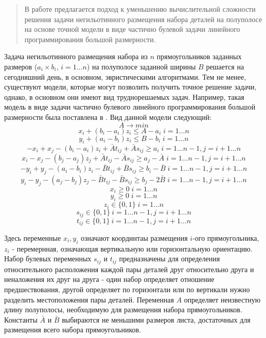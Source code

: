 
\maketitle

\begin{abstract}
В работе предлагается подход к уменьшению вычислительной сложности решения задачи негильотинного размещения набора деталей на полуполосе на основе точной модели в виде частично булевой задачи линейного программирования большой размерности.

\end{abstract}

Задача негильотинного размещения набора из $n$ прямоугольников заданных размеров ($a_i \times b_i$, $i=1\ldots n$) на полуполосе заданной ширины $B$ решается на сегодняшний день, в основном, эвристическими алгоритмами. Тем не менее, существуют модели, которые могут позволить получить точное решение задачи, однако, в основном они имеют вид труднорешаемых задач. Например, такая модель в виде задачи частично булевого линейного программирования большой размерности была поставлена в \cite{Andr_Faz_Much}. Вид данной модели следующий:
$$A\to min$$
$$x_i +(b_i-a_i)z_i\le A-a_i \;  i=1\ldots n$$
$$y_i +(a_i-b_i)z_i\le B-b_i \; i=1\ldots n$$
$$-x_i+x_j -(b_i-a_i)z_i +\bar{A}t_{ij}+\bar{A}s_{ij}\ge a_i \; i=1\ldots n-1, j=i+1\ldots n $$
$$x_i-x_j -(b_j-a_j)z_j +\bar{A}t_{ij}-\bar{A}s_{ij}\ge a_j-\bar{A} \; i=1\ldots n-1, j=i+1\ldots n $$
$$-y_i+y_j -(a_i-b_i)z_i -\bar{B}t_{ij}+\bar{B}s_{ij}\ge b_i-\bar{B} \; i=1\ldots n-1, j=i+1\ldots n $$
$$y_i-y_j -(a_j-b_j)z_j -\bar{B}t_{ij}-\bar{B}s_{ij}\ge b_j-2\bar{B} \; i=1\ldots n-1, j=i+1\ldots n $$
$$x_i \ge 0 \; i=1\ldots n$$
$$y_i \ge 0 \; i=1\ldots n$$
$$z_i \in\{0,1\} \; i=1\ldots n$$
$$s_{ij}\in \{0,1\} \: i=1\ldots n-1, j=i+1\ldots n$$
$$t_{ij}\in \{0,1\} \: i=1\ldots n-1, j=i+1\ldots n$$
%

Здесь переменные $x_i, y_i$ означают координтаы размещения $i$-ого прямоугольника, $z_i$ - перемернная, означающая вертикальную или горизонтальную ориентацию. Набор булевых переменных $s_{ij}$ и $t_{ij}$ предназначены для определения относительного расположения каждой пары деталей друг относительно друга и неналожения их друг на друга - один набор определяет отношение предшествования, другой определяет по горизонтали или по вертикали нужно разделить местоположения пары деталей. Переменная $A$ определяет неизвестную длину полуполосы, необходимую для размещения набора прямоугольников. Константы $\bar{A}$ и $\bar{B}$ выбираются не меньшими размеров листа, достаточных для размещения всего набора прямоугольников.

